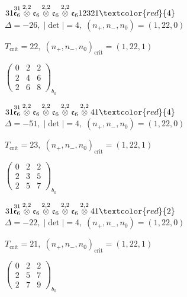 \documentclass[10pt]{article}
\begin{document}
\smallskip

$31\overset{31}{\mathfrak{e}_6}\overset{2,2}{\otimes}\mathfrak{e}_6\overset{2,2}{\otimes}\mathfrak{e}_6\overset{2,2}{\otimes}\mathfrak{e}_612321\textcolor{red}{4}$ \quad $\Delta=-26,\; |\det|=4,\; (n_+,n_-,n_0)=(1,22,0)$

\hspace{1em}$T_{\text{crit}}=22,\; (n_+,n_-,n_0)_{\text{crit}}=(1,22,1)$

\hspace{2em}$\left(\begin{smallmatrix}0 & 2 & 2 \\ 2 & 4 & 6 \\ 2 & 6 & 8\end{smallmatrix}\right)_{\!b_0}$

\smallskip

$31\overset{31}{\mathfrak{e}_6}\overset{2,2}{\otimes}\mathfrak{e}_6\overset{2,2}{\otimes}\mathfrak{e}_6\overset{2,2}{\otimes}\mathfrak{e}_6\overset{2,2}{\otimes}41\textcolor{red}{4}$ \quad $\Delta=-51,\; |\det|=4,\; (n_+,n_-,n_0)=(1,22,0)$

\hspace{1em}$T_{\text{crit}}=23,\; (n_+,n_-,n_0)_{\text{crit}}=(1,22,1)$

\hspace{2em}$\left(\begin{smallmatrix}0 & 2 & 2 \\ 2 & 3 & 5 \\ 2 & 5 & 7\end{smallmatrix}\right)_{\!b_0}$

$31\overset{31}{\mathfrak{e}_6}\overset{2,2}{\otimes}\mathfrak{e}_6\overset{2,2}{\otimes}\mathfrak{e}_6\overset{2,2}{\otimes}\mathfrak{e}_6\overset{2,2}{\otimes}41\textcolor{red}{2}$ \quad $\Delta=-22,\; |\det|=4,\; (n_+,n_-,n_0)=(1,22,0)$

\hspace{1em}$T_{\text{crit}}=21,\; (n_+,n_-,n_0)_{\text{crit}}=(1,22,1)$

\hspace{2em}$\left(\begin{smallmatrix}0 & 2 & 2 \\ 2 & 5 & 7 \\ 2 & 7 & 9\end{smallmatrix}\right)_{\!b_0}$
\end{document}
